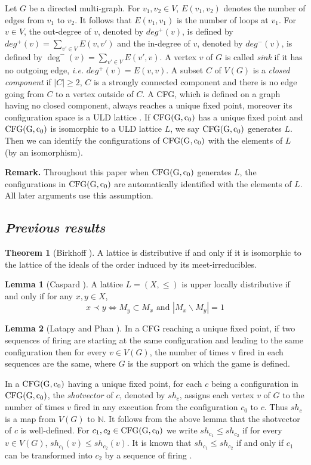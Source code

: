 \documentclass{article}
\theoremstyle{definition}
\newtheorem{lem}{Lemma}
\newtheorem{theo}{Theorem}
\newcommand\shotvector[2]{sh_{#1}(#2)}
\newcommand\oneshotvector[1]{sh_{#1}}
\begin{document}
Let $G$ be a directed multi-graph. For $v_1,v_2\in V$, $E(v_1,v_2)$ denotes the number of edges from $v_1$ to $v_2$. It follows that $E(v_1,v_1)$ is the number of loops at $v_1$. For $v \in V$, the out-degree of $v$, denoted by $deg^{+}(v)$, is defined by $deg^{+}(v)=\underset{v' \in V}{\sum}E(v,v')$ and the in-degree of $v$, denoted by $deg^{-}(v)$, is defined by $\deg^{-}(v) =\underset{v'\in V}{\sum}E(v',v)$. A vertex $v$ of $G$ is called \emph{sink} if it has no outgoing edge, \emph{i.e.} $deg^{+}(v)=E(v,v)$. A subset $C$ of $V(G)$ is a \emph{closed component} if $|C|\geq 2$, $C$ is a strongly connected component and there is no edge going from $C$ to a vertex outside of $C$. A CFG, which is defined on a graph having no closed component, always reaches a unique fixed point, moreover its configuration space is a ULD lattice  \cite{BL92,LP01}. If ${\rm CFG(G,c_0)}$ has a unique fixed point and ${\rm CFG(G,c_0)}$ is isomorphic to a ULD lattice $L$, we say ${\rm CFG(G,c_0)}$ generates $L$. Then we can identify the configurations of ${\rm CFG(G,c_0)}$ with the elements of $L$ (by an isomorphism).

\textbf{Remark. }Throughout this paper when ${\rm CFG(G,c_0)}$ generates $L$, the configurations in ${\rm CFG(G,c_0)}$ are automatically identified with the elements of $L$. All later arguments use this assumption.
\subsection{\small \textit{Previous results}}
\begin{theo}[Birkhoff \cite{B33}]
A lattice is distributive if and only if it is isomorphic to the lattice of the ideals of the order induced by its meet-irreducibles.
\end{theo}
\begin{lem}[Caspard \cite{C98}]
\label{condition on cover relation for ULD lattice}
A lattice $L=(X,\leq)$ is upper locally distributive if and only if for any $x,y \in X$,
$$
x \prec y \Leftrightarrow M_y \subset M_x \text{ and } |M_x\backslash M_y|=1
$$
\end{lem}
\begin{lem}[Latapy and Phan \cite{LP01}]
In a CFG reaching a unique fixed point, if two sequences of firing are starting at the same configuration and leading to the same configuration then for every $v \in V(G)$, the number of times v fired in each sequences are the same, where $G$ is the support on which the game is  defined. 
\end{lem}
In a ${\rm CFG(G,c_0)}$ having a unique fixed point, for each $c$ being a configuration in ${\rm CFG(G,c_0)}$, the \emph{shotvector} of $c$, denoted by $\oneshotvector{c}$, assigns each vertex $v$ of $G$ to the number of times $v$ fired in any execution from the  configuration $c_0$  to $c$. Thus $\oneshotvector{c}$ is a map from $V(G)$ to $\mathbb{N}$. It follows from the above lemma that the shotvector of $c$ is well-defined. For $c_1,c_2\in {\rm CFG(G,c_0)}$ we write $\oneshotvector{c_1} \leq \oneshotvector{c_2}$ if for every $v \in V(G)$, $\shotvector{c_1}{v}\leq \shotvector{c_2}{v}$. It is known that $\oneshotvector{c_1}\leq \oneshotvector{c_2}$ if and only if $c_1$ can be transformed into $c_2$ by a sequence of firing \cite{LP01}. 
\end{document}

